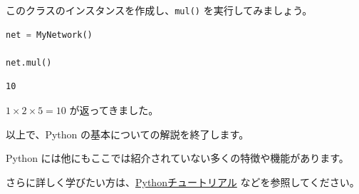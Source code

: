 このクラスのインスタンスを作成し、\texttt{mul()} を実行してみましょう。


\begin{lstlisting}[style=codecell,language=Python]
net = MyNetwork()

net.mul()
\end{lstlisting}

\begin{lstlisting}[style=outputcell]
10
\end{lstlisting}

$1 \times 2 \times 5 = 10$ が返ってきました。


以上で、Python の基本についての解説を終了します。

Python には他にもここでは紹介されていない多くの特徴や機能があります。

さらに詳しく学びたい方は、\href{https://docs.python.org/ja/3/tutorial/index.html}{Pythonチュートリアル} などを参照してください。
